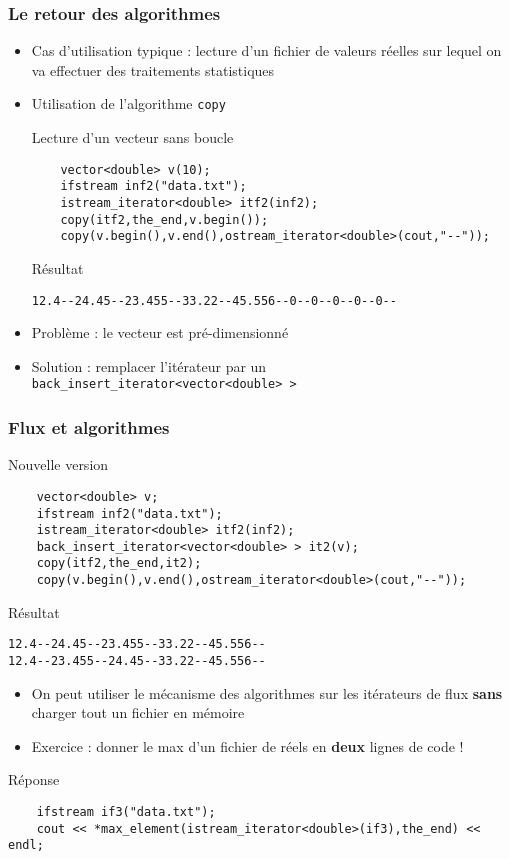 \begin{frame}[fragile]\frametitle{Le retour des algorithmes}
\begin{itemize}
\item Cas d'utilisation typique : lecture d'un fichier de valeurs réelles sur lequel on va effectuer des traitements statistiques
\item Utilisation de l'algorithme \verb|copy|
\begin{codeblock}{Lecture d'un vecteur sans boucle}
\begin{lstlisting}
    vector<double> v(10);
    ifstream inf2("data.txt");
    istream_iterator<double> itf2(inf2);
    copy(itf2,the_end,v.begin());
    copy(v.begin(),v.end(),ostream_iterator<double>(cout,"--"));
\end{lstlisting}
\end{codeblock}
\pause\begin{block}{Résultat}
{\tiny
\begin{verbatim}
12.4--24.45--23.455--33.22--45.556--0--0--0--0--0--
\end{verbatim}
}
\end{block}
\pause
\item Problème : le vecteur est pré-dimensionné
\item Solution : remplacer l'itérateur par un \verb|back_insert_iterator<vector<double> >|
\end{itemize}
\end{frame}

\begin{frame}[fragile]\frametitle{Flux et algorithmes}
\begin{codeblock}{Nouvelle version}
\begin{lstlisting}
    vector<double> v;
    ifstream inf2("data.txt");
    istream_iterator<double> itf2(inf2);
    back_insert_iterator<vector<double> > it2(v);
    copy(itf2,the_end,it2);
    copy(v.begin(),v.end(),ostream_iterator<double>(cout,"--"));
\end{lstlisting}
\end{codeblock}
\pause\begin{block}{Résultat}
{\tiny
\begin{verbatim}
12.4--24.45--23.455--33.22--45.556--
12.4--23.455--24.45--33.22--45.556--
\end{verbatim}
}
\end{block}
\begin{itemize}
\item On peut utiliser le mécanisme des algorithmes sur les itérateurs de flux \textbf{sans} charger tout un fichier en mémoire
\item Exercice : donner le max d'un fichier de réels en \textbf{deux} lignes de code !
\end{itemize}
\begin{codeblock}{Réponse}
\begin{lstlisting}
    ifstream if3("data.txt");
    cout << *max_element(istream_iterator<double>(if3),the_end) << endl;
\end{lstlisting}
\end{codeblock}
\end{frame}

